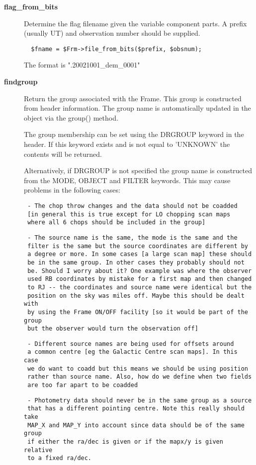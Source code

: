 \begin{description}
\begin{description}
\begin{description}
\item[{\textbf{flag\_from\_bits}}] \mbox{}

Determine the flag filename given the variable component
parts. A prefix (usually UT) and observation number should
be supplied.

\begin{verbatim}
  $fname = $Frm->file_from_bits($prefix, $obsnum);
\end{verbatim}


The format is ".20021001\_dem\_0001"


\item[{\textbf{findgroup}}] \mbox{}

Return the group associated with the Frame. This group is constructed
from header information. The group name is automatically updated in
the object via the group() method.



The group membership can be set using the DRGROUP keyword in the
header. If this keyword exists and is not equal to 'UNKNOWN' the
contents will be returned.



Alternatively, if DRGROUP is not specified the group name is
constructed from the MODE, OBJECT and FILTER keywords. This may cause
problems in the following cases:

\begin{verbatim}
 - The chop throw changes and the data should not be coadded
 [in general this is true except for LO chopping scan maps
 where all 6 chops should be included in the group]
\end{verbatim}
\begin{verbatim}
 - The source name is the same, the mode is the same and the
 filter is the same but the source coordinates are different by
 a degree or more. In some cases [a large scan map] these should
 be in the same group. In other cases they probably should not
 be. Should I worry about it? One example was where the observer
 used RB coordinates by mistake for a first map and then changed
 to RJ -- the coordinates and source name were identical but the
 position on the sky was miles off. Maybe this should be dealt with
 by using the Frame ON/OFF facility [so it would be part of the group
 but the observer would turn the observation off]
\end{verbatim}
\begin{verbatim}
 - Different source names are being used for offsets around
 a common centre [eg the Galactic Centre scan maps]. In this case
 we do want to coadd but this means we should be using position
 rather than source name. Also, how do we define when two fields
 are too far apart to be coadded
\end{verbatim}
\begin{verbatim}
 - Photometry data should never be in the same group as a source
 that has a different pointing centre. Note this really should take
 MAP_X and MAP_Y into account since data should be of the same group
 if either the ra/dec is given or if the mapx/y is given relative
 to a fixed ra/dec.
\end{verbatim}



\end{description}
\end{description}
\end{description}
